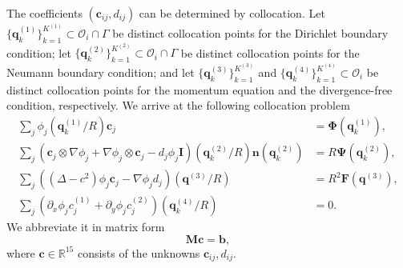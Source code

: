 \documentclass[preprint,11pt]{elsarticle}
\theoremstyle{remark}
\newcommand{\paren}[1]{\left(#1\right)}
\newcommand{\grad}[1]{\nabla #1}
\newcommand{\mc}[1]{\mathcal{#1}}
\newcommand{\wh}[1]{\widehat{#1}}
\newcommand{\bm}[1]{\boldsymbol{#1}}
\newcommand{\R}{\mathbb{R}}
\begin{document}
The coefficients $(\bm c_{ij}, d_{ij})$ can be determined by collocation.
Let $ \{\bm q^{(1)}_k\}_{k=1}^{K^{(1)}}\subset \mc O_i\cap\Gamma$ be distinct collocation points for the Dirichlet boundary condition; let $\{\bm q^{(2)}_k\}_{k=1}^{K^{(2)}}\subset \mc O_i\cap\Gamma$ be distinct collocation points for the Neumann boundary condition; and let $\{\bm q^{(3)}_k\}_{k=1}^{K^{(3)}}$ and $\{\bm q^{(4)}_k\}_{k=1}^{K^{(4)}}\subset \mc O_i$ be distinct collocation points for the momentum equation and the divergence-free condition, respectively. We arrive at the following collocation problem
\begin{subequations}
    \begin{align}
        \sum_j \phi_j(\bm q_k^{(1)} / R) \bm c_j &= \bm \Phi(\bm q_k^{(1)}),\\
        \sum_j \paren{\bm c_j\otimes\grad \phi_j + \grad\phi_j \otimes \bm c_j - d_j\phi_j \bm I}(\bm q_k^{(2)}/R)\bm n(\bm q_k^{(2)}) &= R\bm\Psi(\bm q_k^{(2)}),\\
        \sum_j\paren{(\Delta-c^2)\phi_j \bm c_j - \grad\phi_j d_j}(\bm q^{(3)}/R) &= R^2 \bm F(\bm q^{(3)}),\\
        \sum_j\paren{\partial_x \phi_j c_j^{(1)} + \partial_y \phi_j c_j^{(2)}}(\bm q_k^{(4)}/R) & = 0.
    \end{align}
\end{subequations}
We abbreviate it in matrix form
\begin{equation}\label{eqn:Mcb}
    \bm M \bm c = \bm b,
\end{equation}
where $\bm c \in \R ^{15}$ consists of the unknowns $\bm c_{ij}, d_{ij}$.
\end{document}
